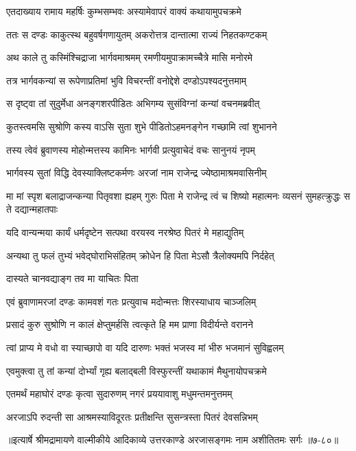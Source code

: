 
\twolineshloka
{एतदाख्याय रामाय महर्षिः कुम्भसम्भवः}
{अस्यामेवापरं वाक्यं कथायामुपचक्रमे} %

\twolineshloka
{ततः स दण्डः काकुत्स्थ बहुवर्षगणायुतम्}
{अकरोत्तत्र दान्तात्मा राज्यं निहतकण्टकम्} %

\twolineshloka
{अथ काले तु कस्मिंश्चिद्राजा भार्गवमाश्रमम्}
{रमणीयमुपाक्रामच्चैत्रे मासि मनोरमे} %

\twolineshloka
{तत्र भार्गवकन्यां स रूपेणाप्रतिमां भुवि}
{विचरन्तीं वनोद्देशे दण्डोऽपश्यदनुत्तमाम्} %

\twolineshloka
{स दृष्ट्वा तां सुदुर्मेधा अनङ्गशरपीडितः}
{अभिगम्य सुसंविग्नां कन्यां वचनमब्रवीत्} %

\twolineshloka
{कुतस्त्वमसि सुश्रोणि कस्य वाऽसि सुता शुभे}
{पीडितोऽहमनङ्गेन गच्छामि त्वां शुभानने} %

\twolineshloka
{तस्य त्वेवं ब्रुवाणस्य मोहोन्मत्तस्य कामिनः}
{भार्गवी प्रत्युवाचेदं वचः सानुनयं नृपम्} %

\twolineshloka
{भार्गवस्य सुतां विद्धि देवस्याक्लिष्टकर्मणः}
{अरजां नाम राजेन्द्र ज्येष्ठामाश्रमवासिनीम्} %

\threelineshloka
{मा मां स्पृश बलाद्राजन्कन्या पितृवशा ह्यहम्}
{गुरुः पिता मे राजेन्द्र त्वं च शिष्यो महात्मनः}
{व्यसनं सुमहत्क्रुद्धः स ते दद्यान्महातपाः} %

\twolineshloka
{यदि वान्यन्मया कार्यं धर्मदृष्टेन सत्पथा}
{वरयस्व नरश्रेष्ठ पितरं मे महाद्युतिम्} %

\twolineshloka
{अन्यथा तु फलं तुभ्यं भवेद्घोराभिसंहितम्}
{क्रोधेन हि पिता मेऽसौ त्रैलोक्यमपि निर्दहेत्} %

\onelineshloka
{दास्यते चानवद्याङ्ग तव मा याचितः पिता} %

\twolineshloka
{एवं ब्रुवाणामरजां दण्डः कामवशं गतः}
{प्रत्युवाच मदोन्मत्तः शिरस्याधाय चाञ्जलिम्} %

\twolineshloka
{प्रसादं कुरु सुश्रोणि न कालं क्षेप्तुमर्हसि}
{त्वत्कृते हि मम प्राणा विदीर्यन्ते वरानने} %

\twolineshloka
{त्वां प्राप्य मे वधो वा स्याच्छापो वा यदि दारुणः}
{भक्तं भजस्व मां भीरु भजमानं सुविह्वलम्} %

\twolineshloka
{एवमुक्त्वा तु तां कन्यां दोर्भ्यां गृह्य बलाद्बली}
{विस्फुरन्तीं यथाकामं मैथुनायोपचक्रमे} %

\twolineshloka
{एतमर्थं महाघोरं दण्डः कृत्वा सुदारुणम्}
{नगरं प्रययावाशु मधुमन्तमनुत्तमम्} %

\twolineshloka
{अरजाऽपि रुदन्ती सा आश्रमस्याविदूरतः}
{प्रतीक्षन्ति सुसन्त्रस्ता पितरं देवसन्निभम्} %


॥इत्यार्षे श्रीमद्रामायणे वाल्मीकीये आदिकाव्ये उत्तरकाण्डे अरजासङ्गमः नाम अशीतितमः सर्गः ॥७-८०॥
